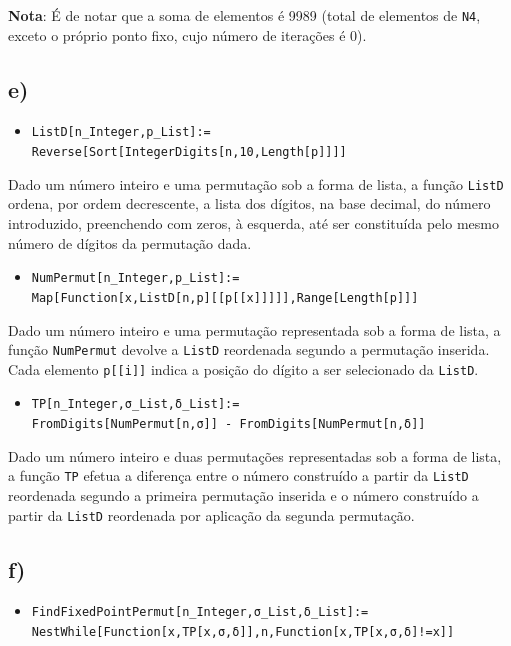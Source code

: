 \documentclass[12pt,a4paper]{article}
\begin{document}
        \textbf{Nota}: É de notar que a soma de elementos é 9989 (total de elementos de \texttt{N4}, exceto o próprio ponto fixo, cujo número de iterações é 0).

    \subsection{e)}
        \begin{itemize}
            \item \texttt{ListD[n\_Integer,p\_List]:= Reverse[Sort[IntegerDigits[n,10,Length[p]]]]}
        \end{itemize}

        Dado um número inteiro e uma permutação sob a forma de lista, a função \texttt{ListD} ordena, por ordem decrescente, a lista dos dígitos, na base decimal, do número introduzido, preenchendo com zeros, \`a esquerda, até ser constituída pelo mesmo número de dígitos da permutação dada.

        \begin{itemize}
            \item \texttt{NumPermut[n\_Integer,p\_List]:= \\ Map[Function[x,ListD[n,p][[p[[x]]]]],Range[Length[p]]]}
        \end{itemize}

        Dado um número inteiro e uma permutação representada sob a forma de lista, a função \texttt{NumPermut} devolve a \texttt{ListD} reordenada segundo a permutação inserida. Cada elemento \texttt{p[[i]]} indica a posição do dígito a ser selecionado da \texttt{ListD}.

        \begin{itemize}
            \item \texttt{TP[n\_Integer,σ\_List,δ\_List]:= \\ FromDigits[NumPermut[n,σ]] - FromDigits[NumPermut[n,δ]]}
        \end{itemize}

        Dado um número inteiro e duas permutações representadas sob a forma de lista, a função \texttt{TP} efetua a diferença entre o número construído a partir da \texttt{ListD} reordenada segundo a primeira permutação inserida e o número construído a partir da \texttt{ListD} reordenada por aplicação da segunda permutação.

    \subsection{f)}
        \begin{itemize}
            \item \texttt{FindFixedPointPermut[n\_Integer,σ\_List,δ\_List]:= \\ NestWhile[Function[x,TP[x,σ,δ]],n,Function[x,TP[x,σ,δ]!=x]]}
        \end{itemize}
\end{document}

